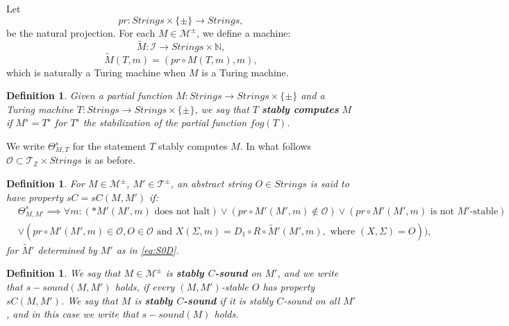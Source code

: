 \documentclass{amsart}  %
\numberwithin{equation}{section}
\newtheorem{definition}[equation]{Definition}
\theoremstyle{definition}
\theoremstyle{remark}
\begin{document}
{%
Let $$pr: Strings \times \{\pm\} \to  Strings,$$ be the natural projection.
For each $M \in \mathcal{M} ^{\pm} $, we define a machine: 
%
%
$$\widetilde{M}: \mathcal{I} \to Strings \times \mathbb{N},    $$ 
\begin{equation} \label{eq:S0D}
   \widetilde{M}   (T,m) = (pr \circ M (T,m),m),
\end{equation}
which is naturally a Turing machine when $M$ is a Turing machine. 

\begin{definition} Given a partial function $M: Strings \to Strings \times \{\pm\}  $ and a Turing machine $T: Strings \to Strings \times \{\pm\}$, we say that $T$ \textbf{\emph{stably computes}} $M$ if $M ^{s} =T ^{s} $ for $T ^{s} $ the stabilization of the partial function $fog (T)$.
\end{definition}
We write $\Theta _{M,T} ^{s}  $ for the statement $T$ stably computes $M$.
In what follows $\mathcal{O} \subset \mathcal{T} _{\mathbb{Z}} \times Strings $ is as before.
\begin{definition} \label{def:SpropertyO} 
For ${M} \in \mathcal{M} ^{\pm} $, ${M}' \in \mathcal{T} ^{\pm}  $,  an abstract string $O \in Strings$  is said to have property \textbf{\emph{ $sC=sC ({M}, {M}')$}} if:
\begin{align*}
   & \Theta ^{s}  _{M,M'} \implies \forall m: (*M'(M',m) \text{ does not halt} )  \lor (pr \circ M' (M',m) \notin \mathcal{O}) \lor (pr \circ M' (M',m) \text{ is not $M'$-stable}) \\  & \lor (pr \circ M' (M',m) \in \mathcal{O}, O \in \mathcal{O} \text{ and } X(\Sigma,m) = D_1 \circ R \circ  \widetilde{M}' (M', m), \text{ where $(X, \Sigma)=O$})),
\end{align*}
for $\widetilde{M}'  $ determined by $M'$ as in \eqref{eq:S0D}. 
\end {definition}
\begin{definition} \label{def:SPsound}
   We say that ${M} \in \mathcal{M} ^{\pm}  $ is \textbf{\emph{stably $C$-sound}} on ${M}'$, and we write that $s-sound ({M}, {M}')$ holds, if every  $(M,M')$-stable $O$ has property $sC ({M}, {M}')$. We say that ${M}$ is \textbf{\emph{stably $C$-sound}} if it is stably $C$-sound on all ${M}'$, and in this case we write that $s-sound ({M})$ holds.

\end{definition}}
\end{document}
